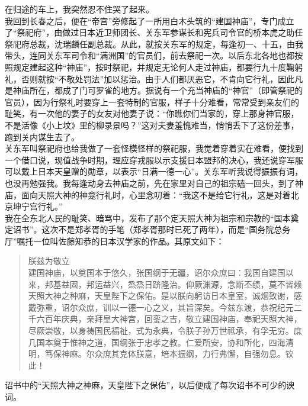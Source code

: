 在归途的车上，我突然忍不住哭了起来。\\

我回到长春之后，便在“帝宫”旁修起了一所用白木头筑的“建国神庙”，专门成立了“祭祀府”，由做过日本近卫师团长、关东军参谋长和宪兵司令官的桥本虎之助任祭祀府总裁，沈瑞麟任副总裁。从此，就按关东军的规定，每逢初一、十五，由我带头，连同关东军司令和“满洲国”的官员们，前去祭祀一次。以后东北各地也都按照规定建起这种“神庙”，按时祭祀，并规定无论何人走过神庙，都要行九十度鞠躬礼，否则就按“不敬处罚法”加以惩治。由于人们都厌恶它，不肯向它行礼，因此凡是神庙所在，都成了门可罗雀的地方。据说有一个充当神庙的“神官”（即管祭祀的官员），因为行祭礼时要穿上一套特制的官服，样子十分难看，常常受到亲友们的耻笑，有一次他的妻子的女友对他妻子说：“你瞧你们当家的，穿上那身神官服，不是活像《小上坟》里的柳录景吗？”这对夫妻羞愧难当，悄悄丢下了这份差事，跑到关内谋生去了。\\

关东军叫祭祀府也给我做了一套怪模怪样的祭祀服，我觉着穿着实在难看，便找到一个借口说，现值战争时期，理应穿戎服以示支援日本盟邦的决心，我还说穿军服可以戴上日本天皇赠的勋章，以表示“日满一德一心”。关东军听我说得振振有词，也没再勉强我。我每逢动身去神庙之前，先在家里对自己的祖宗磕一回头，到了神庙，面向天照大神的神龛行礼时，心里念叨着：“我这不是给它行礼，这是对着北京坤宁宫行礼。”\\

我在全东北人民的耻笑、暗骂中，发布了那个定天照大神为祖宗和宗教的“国本奠定诏书”。这次不是郑孝胥的手笔（郑孝胥那时已死了两年），而是“国务院总务厅”嘱托一位叫佐藤知恭的日本汉学家的作品。其原文如下：\\

\begin{quote}
	朕兹为敬立\\

建国神庙，以奠国本于悠久，张国纲于无疆，诏尔众庶曰：我国自建国以来，邦基益固，邦运益兴，烝烝日跻隆治。仰厥渊源，念斯丕绩，莫不皆赖天照大神之种麻，天皇陛下之保佑。是以朕向躬访日本皇室，诚烟致谢，感戴弥重，诏尔众庶，训以一德一心之义，其旨深矣。今兹东渡，恭祝纪元二千六百年庆典，亲拜皇大神宫，回銮之吉，敬立建国神庙，奉祀天照大神，尽厥崇敬，以身祷国民福祉，式为永典，令朕子孙万世祗承，有孚无穷。庶几国本奠于惟神之道，国纲张于忠孝之教。仁爱所安，协和所化，四海清明，笃保神麻。尔众庶其克体朕意，培本振纲，力行弗懈，自强勿息。钦此！\\
\end{quote}

诏书中的“天照大神之神麻，天皇陛下之保佑”，以后便成了每次诏书不可少的谀词。\\

